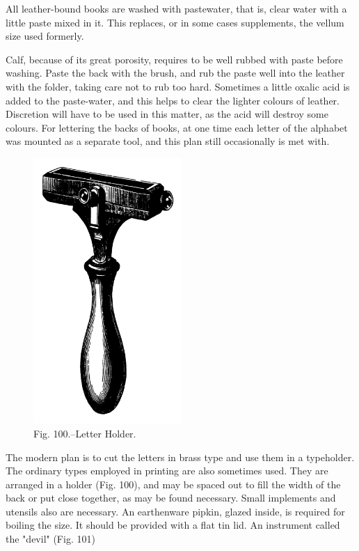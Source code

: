 \documentclass[twoside]{book}
\begin{document}
All leather-bound books are washed with pastewater,
that is, clear water with a little paste mixed in
it. This replaces, or in some cases supplements,
the vellum size used formerly.

Calf, because of its great porosity, requires to be
well rubbed with paste before washing. Paste the
back with the brush, and rub the paste well into the
leather with the folder, taking care not to rub too hard.
Sometimes a little oxalic acid is added to the
\pagebreak
paste-water, and this helps to clear the lighter
colours of leather. Discretion will have to be used
in this matter, as the acid will destroy some colours.
For lettering the backs of books, at one time each
letter of the alphabet was mounted as a separate
tool, and this plan still occasionally is met with.
	\begin{figure}[h]
		\centering
		\includegraphics[width=0.5\textwidth]{Figures/_100.png}
		\caption*{Fig. 100.--Letter Holder.}
	\end{figure}
The modern plan is to cut the letters in brass type
and use them in a typeholder. The ordinary types
employed in printing are also sometimes used.
They are arranged in a holder (Fig. 100), and may be
spaced out to fill the width of the back or put close
together, as may be found necessary.
\pagebreak
Small implements and utensils also are necessary.
An earthenware pipkin, glazed inside, is required for
boiling the size. It should be provided with a flat
tin lid. An instrument called the "devil" (Fig. 101)
\end{document}
